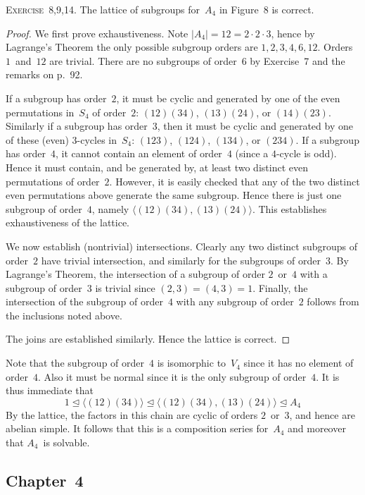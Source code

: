 \documentclass[letterpaper]{article}
\newcommand{\exercise}[1]{\goodbreak\noindent\textsc{Exercise~{#1}.}}
\newcommand{\normal}{\trianglelefteq}
\newcommand{\ord}[1]{|{#1}|}
\newcommand{\gen}[1]{\langle{#1}\rangle}
\begin{document}
\bigskip
\exercise{8,9,14}
The lattice of subgroups for~$A_4$ in Figure~8 is correct.
\begin{proof}
We first prove exhaustiveness. Note $\ord{A_4}=12=2\cdot2\cdot3$, hence by Lagrange's Theorem the only possible subgroup orders are $1,2,3,4,6,12$. Orders $1$~and~$12$ are trivial. There are no subgroups of order~$6$ by Exercise~7 and the remarks on p.~92.

If a subgroup has order~$2$, it must be cyclic and generated by one of the even permutations in~$S_4$ of order~$2$: $(12)(34)$, $(13)(24)$, or $(14)(23)$. Similarly if a subgroup has order~$3$, then it must be cyclic and generated by one of these (even) $3$-cycles in~$S_4$: $(123)$, $(124)$, $(134)$, or $(234)$. If a subgroup has order~$4$, it cannot contain an element of order~$4$ (since a $4$-cycle is odd). Hence it must contain, and be generated by, at least two distinct even permutations of order~$2$. However, it is easily checked that any of the two distinct even permutations above generate the same subgroup. Hence there is just one subgroup of order~$4$, namely $\gen{(12)(34),(13)(24)}$. This establishes exhaustiveness of the lattice.

We now establish (nontrivial) intersections. Clearly any two distinct subgroups of order~$2$ have trivial intersection, and similarly for the subgroups of order~$3$. By Lagrange's Theorem, the intersection of a subgroup of order $2$~or~$4$ with a subgroup of order~$3$ is trivial since $(2,3)=(4,3)=1$. Finally, the intersection of the subgroup of order~$4$ with any subgroup of order~$2$ follows from the inclusions noted above.

The joins are established similarly. Hence the lattice is correct.
\end{proof}
\noindent Note that the subgroup of order~$4$ is isomorphic to~$V_4$ since it has no element of order~$4$. Also it must be normal since it is the only subgroup of order~$4$. It is thus immediate that
$$1\normal\gen{(12)(34)}\normal\gen{(12)(34),(13)(24)}\normal A_4$$
By the lattice, the factors in this chain are cyclic of orders $2$~or~$3$, and hence are abelian simple. It follows that this is a composition series for~$A_4$ and moreover that $A_4$~is solvable.

\subsection*{Chapter~4}
\end{document}
